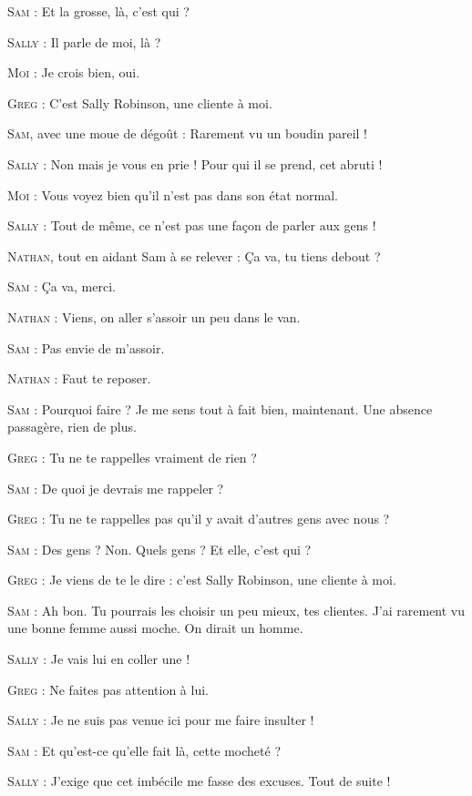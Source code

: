 \begin{dialogue}
\textsc{Sam} : Et la grosse, là, c’est qui ?

\textsc{Sally} : Il parle de moi, là ?

\textsc{Moi} : Je crois bien, oui.

\textsc{Greg} : C’est Sally Robinson, une cliente à moi.

\textsc{Sam}, avec une moue de dégoût : Rarement vu un boudin pareil !

\textsc{Sally} : Non mais je vous en prie ! Pour qui il se prend, cet abruti !

\textsc{Moi} : Vous voyez bien qu’il n’est pas dans son état normal.

\textsc{Sally} : Tout de même, ce n’est pas une façon de parler aux gens !

\textsc{Nathan}, tout en aidant Sam à se relever : Ça va, tu tiens debout ?

\textsc{Sam} : Ça va, merci.

\textsc{Nathan} : Viens, on aller s’assoir un peu dans le van.

\textsc{Sam} : Pas envie de m’assoir.

\textsc{Nathan} : Faut te reposer.

\textsc{Sam} : Pourquoi faire ? Je me sens tout à fait bien, maintenant. Une absence passagère, rien de plus.

\textsc{Greg} : Tu ne te rappelles vraiment de rien ?

\textsc{Sam} : De quoi je devrais me rappeler ?

\textsc{Greg} : Tu ne te rappelles pas qu’il y avait d’autres gens avec nous ?

\textsc{Sam} : Des gens ? Non. Quels gens ? Et elle, c’est qui ?

\textsc{Greg} : Je viens de te le dire : c’est Sally Robinson, une cliente à moi.

\textsc{Sam} : Ah bon. Tu pourrais les choisir un peu mieux, tes clientes. J’ai rarement vu une bonne femme aussi moche. On dirait un homme.

\textsc{Sally} : Je vais lui en coller une !

\textsc{Greg} : Ne faites pas attention à lui.

\textsc{Sally} : Je ne suis pas venue ici pour me faire insulter !

\textsc{Sam} : Et qu’est-ce qu’elle fait là, cette mocheté ?

\textsc{Sally} : J’exige que cet imbécile me fasse des excuses. Tout de suite !


\end{dialogue}
